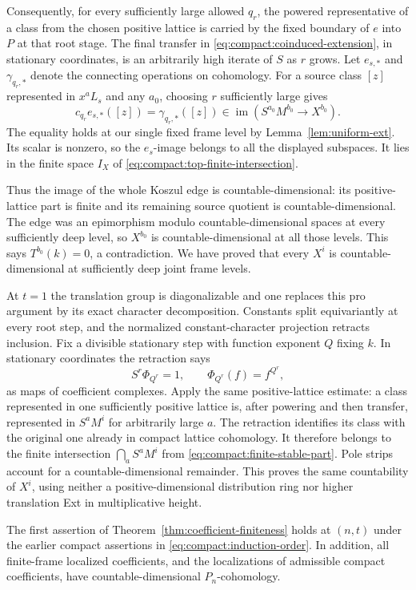 Consequently, for every sufficiently large allowed $q_r$, the powered
representative of a class from the chosen positive lattice is carried
by the fixed boundary of $e$ into $P$ at that root stage.  The final
transfer in \eqref{eq:compact:coinduced-extension}, in stationary
coordinates, is an arbitrarily high iterate of $S$ as $r$ grows.
Let $e_{s,*}$ and $\gamma_{q_r,*}$ denote the connecting operations on
cohomology. For a source class $[z]$ represented in $x^aL_s$ and any
$a_0$, choosing $r$ sufficiently large gives
\[
 c_{q_r}e_{s,*}([z])=\gamma_{q_r,*}([z])
       \in\operatorname{im}(S^{a_0}M^{b_0}\to X^{b_0}).
\]
The equality holds at our single fixed frame level by
Lemma~\ref{lem:uniform-ext}. Its scalar is nonzero, so the
$e_s$-image belongs to all the displayed subspaces. It lies in the
finite space $I_X$ of \eqref{eq:compact:top-finite-intersection}.

Thus the image of the whole Koszul edge is countable-dimensional:
its positive-lattice part is finite and its remaining source quotient
is countable-dimensional.  The edge was an epimorphism modulo
countable-dimensional spaces at every sufficiently deep level, so
$X^{b_0}$ is countable-dimensional at all those levels.  This says
$T^{b_0}(k)=0$, a contradiction.  We have proved that every $X^i$
is countable-dimensional at sufficiently deep joint frame levels.

At $t=1$ the translation group is diagonalizable and one replaces this
pro argument by its exact character decomposition.  Constants split
equivariantly at every root step, and the normalized constant-character
projection retracts inclusion. Fix a divisible stationary step with
function exponent $Q$ fixing $k$. In stationary coordinates the
retraction says
\[
 S^r\Phi_{Q^r}=1,\qquad \Phi_{Q^r}(f)=f^{Q^r},
\]
as maps of coefficient complexes. Apply the same
positive-lattice estimate: a class represented in one sufficiently
positive lattice is, after powering and then transfer, represented in
$S^aM^i$ for arbitrarily large $a$.  The retraction identifies its
class with the original one already in compact lattice cohomology.
It therefore belongs to the finite intersection
$\bigcap_aS^aM^i$ from
\eqref{eq:compact:finite-stable-part}.  Pole strips account for a
countable-dimensional remainder.  This proves the same countability
of $X^i$, using neither a positive-dimensional distribution ring nor
higher translation Ext in multiplicative height.

\begin{proposition}
\label{prop:compact-finiteness}
The first assertion of Theorem~\ref{thm:coefficient-finiteness} holds
at $(n,t)$ under the earlier compact assertions in
\eqref{eq:compact:induction-order}.  In addition, all finite-frame
localized coefficients, and the localizations of admissible compact
coefficients, have countable-dimensional $P_n$-cohomology.
\end{proposition}

